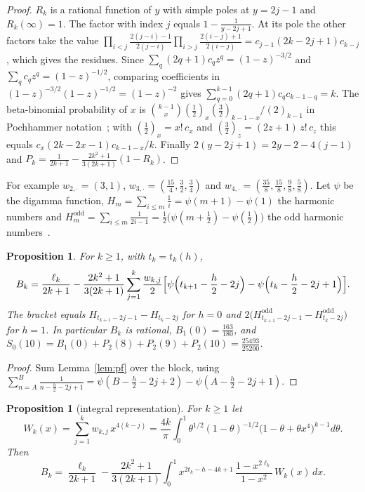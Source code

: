 \documentclass[11pt]{article}
\newtheorem{proposition}[theorem]{Proposition}
\theoremstyle{definition}
\theoremstyle{remark}
\newcommand{\Hodd}{H^{\mathrm{odd}}}
\begin{document}
\begin{proof}
$R_k$ is a rational function of $y$ with simple poles at $y=2j-1$ and
$R_k(\infty)=1$. The factor with index $j$ equals $1-\frac1{y-2j+1}$. At
its pole the other factors take the value
$\prod_{i<j}\frac{2(j-i)-1}{2(j-i)}\prod_{i>j}\frac{2(i-j)+1}{2(i-j)}
=c_{j-1}(2k-2j+1)c_{k-j}$, which gives the residues. Since
$\sum_q(2q+1)c_qz^q=(1-z)^{-3/2}$ and $\sum_qc_qz^q=(1-z)^{-1/2}$,
comparing coefficients in $(1-z)^{-3/2}(1-z)^{-1/2}=(1-z)^{-2}$ gives
$\sum_{q=0}^{k-1}(2q+1)c_qc_{k-1-q}=k$. The beta-binomial probability of
$x$ is $\binom{k-1}{x}(\frac12)_x(\frac32)_{k-1-x}/(2)_{k-1}$ in
Pochhammer notation~\cite{JKK}; with $(\frac12)_x=x!\,c_x$ and
$(\frac32)_z=(2z+1)\,z!\,c_z$ this equals $c_x(2k-2x-1)c_{k-1-x}/k$.
Finally $2(y-2j+1)=2y-2-4(j-1)$ and
$P_k=\frac1{2k+1}-\frac{2k^2+1}{3(2k+1)}(1-R_k)$.
\end{proof}

For example $w_{2,\cdot}=(3,1)$, $w_{3,\cdot}=(\frac{15}4,\frac32,\frac34)$
and $w_{4,\cdot}=(\frac{35}8,\frac{15}8,\frac98,\frac58)$. Let $\psi$ be
the digamma function, $H_m=\sum_{i\le m}\frac1i=\psi(m+1)-\psi(1)$ the
harmonic numbers and
$\Hodd_m=\sum_{i\le m}\frac1{2i-1}=\frac12\bigl(\psi(m+\frac12)-\psi(\frac12)\bigr)$
the odd harmonic numbers~\cite[5.4.13, 5.4.15]{DLMF}.

\begin{proposition}\label{prop:blocksum}
For $k\ge1$, with $t_k=t_k(h)$,
\[
B_k=\frac{\ell_k}{2k+1}-\frac{2k^2+1}{3(2k+1)}\sum_{j=1}^{k}\frac{w_{k,j}}2
\Bigl[\psi\Bigl(t_{k+1}-\frac h2-2j\Bigr)-\psi\Bigl(t_k-\frac h2-2j+1\Bigr)\Bigr].
\]
The bracket equals $H_{t_{k+1}-2j-1}-H_{t_k-2j}$ for $h=0$ and
$2\bigl(\Hodd_{t_{k+1}-2j-1}-\Hodd_{t_k-2j}\bigr)$ for $h=1$. In
particular $B_k$ is rational, $B_1(0)=\frac{163}{180}$, and
$S_0(10)=B_1(0)+P_2(8)+P_2(9)+P_2(10)=\frac{25493}{25200}$.
\end{proposition}

\begin{proof}
Sum Lemma~\ref{lem:pf} over the block, using
$\sum_{n=A}^{B}\frac1{n-\frac h2-2j+1}=\psi(B-\frac h2-2j+2)-\psi(A-\frac h2-2j+1)$.
\end{proof}

\begin{proposition}[integral representation]\label{prop:integral}
For $k\ge1$ let
\[
W_k(x)=\sum_{j=1}^kw_{k,j}\,x^{4(k-j)}
=\frac{4k}{\pi}\int_0^1\theta^{1/2}(1-\theta)^{-1/2}
\bigl(1-\theta+\theta x^4\bigr)^{k-1}d\theta .
\]
Then
\[
B_k=\frac{\ell_k}{2k+1}-\frac{2k^2+1}{3(2k+1)}\int_0^1
x^{2t_k-h-4k+1}\,\frac{1-x^{2\ell_k}}{1-x^2}\,W_k(x)\,dx .
\]
\end{proposition}
\end{document}
